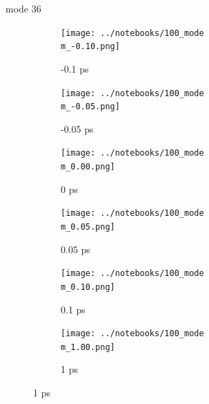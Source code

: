 \documentclass{beamer}
\begin{document}
\renewcommand\m{36}
\begin{frame}{mode \m}
	\begin{figure}
		\centering
		\begin{subfigure}[b]{\w\textwidth}
			\centering
			\texttt{[image: ../notebooks/100\_mode\\m\_-0.10.png]}
			\caption{-0.1 ps}
		\end{subfigure}
		\begin{subfigure}[b]{\w\textwidth}
			\centering
			\texttt{[image: ../notebooks/100\_mode\\m\_-0.05.png]}
			\caption{-0.05 ps}
		\end{subfigure}
		\begin{subfigure}[b]{\w\textwidth}
			\centering
			\texttt{[image: ../notebooks/100\_mode\\m\_0.00.png]}
			\caption{0 ps}
		\end{subfigure}
		\begin{subfigure}[b]{\w\textwidth}
			\centering
			\texttt{[image: ../notebooks/100\_mode\\m\_0.05.png]}
			\caption{0.05 ps}
		\end{subfigure}
		\begin{subfigure}[b]{\w\textwidth}
			\centering
			\texttt{[image: ../notebooks/100\_mode\\m\_0.10.png]}
			\caption{0.1 ps}
		\end{subfigure}
		\begin{subfigure}[b]{\w\textwidth}
			\centering
			\texttt{[image: ../notebooks/100\_mode\\m\_1.00.png]}
			\caption{1 ps}
		\end{subfigure}
	\end{figure}
\end{frame}
\end{document}
